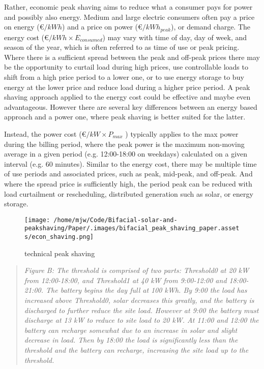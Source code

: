 \documentclass[
]{article}
\begin{document}
Rather, economic peak shaving aims to reduce what a consumer pays for
power and possibly also energy. Medium and large electric consumers
often pay a price on energy (€\(/kWh\)) and a price on power
(€\(/kWh_{peak}\)), or demand charge. The energy cost
(€\(/kWh \times E_{consumed}\)) may vary with time of day, day of week,
and season of the year, which is often referred to as time of use or
peak pricing. Where there is a sufficient spread between the peak and
off-peak prices there may be the opportunity to curtail load during high
prices, use controllable loads to shift from a high price period to a
lower one, or to use energy storage to buy energy at the lower price and
reduce load during a higher price period. A peak shaving approach
applied to the energy cost could be effective and maybe even
advantageous. However there are several key differences between an
energy based approach and a power one, where peak shaving is better
suited for the latter.

Instead, the power cost (€\(/kW \times P_{max}\) ) typically applies to
the max power during the billing period, where the peak power is the
maximum non-moving average in a given period (e.g. 12:00-18:00 on
weekdays) calculated on a given interval (e.g. 60 minutes). Similar to
the energy cost, there may be multiple time of use periods and
associated prices, such as peak, mid-peak, and off-peak. And where the
spread price is sufficiently high, the period peak can be reduced with
load curtailment or rescheduling, distributed generation such as solar,
or energy storage.

\begin{figure}
\centering
\texttt{[image: /home/mjw/Code/Bifacial-solar-and-peakshaving/Paper/.images/bifacial\_peak\_shaving\_paper.assets/econ\_shaving.png]}
\caption{technical peak shaving}
\end{figure}

\begin{quote}
\emph{Figure B: The threshold is comprised of two parts: Threshold0 at
20 kW from 12:00-18:00, and Threshold1 at 40 kW from 9:00-12:00 and
18:00-21:00. The battery begins the day full at 100 kWh. By 9:00 the
load has increased above Threshold0, solar decreases this greatly, and
the battery is discharged to further reduce the site load. However at
9:00 the battery must discharge at 13 kW to reduce to site load to 20
kW. At 11:00 and 12:00 the battery can recharge somewhat due to an
increase in solar and slight decrease in load. Then by 18:00 the load is
significantly less than the threshold and the battery can recharge,
increasing the site load up to the threshold.}
\end{quote}
\end{document}
